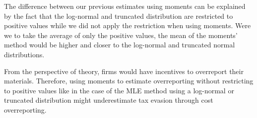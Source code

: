\documentclass[
  12pt]{article}
\theoremstyle{definition}
\theoremstyle{remark}
\begin{document}
\begin{longtable}[t]{llll}
\end{longtable}

The difference between our previous estimates using moments can be
explained by the fact that the log-normal and truncated distribution are
restricted to positive values while we did not apply the restriction
when using moments. Were we to take the average of only the positive
values, the mean of the moments' method would be higher and closer to
the log-normal and truncated normal distributions.

From the perspective of theory, firms would have incentives to
overreport their materials. Therefore, using moments to estimate
overreporting without restricting to positive values like in the case of
the MLE method using a log-normal or truncated distribution might
underestimate tax evasion through cost overreporting.
\end{document}
